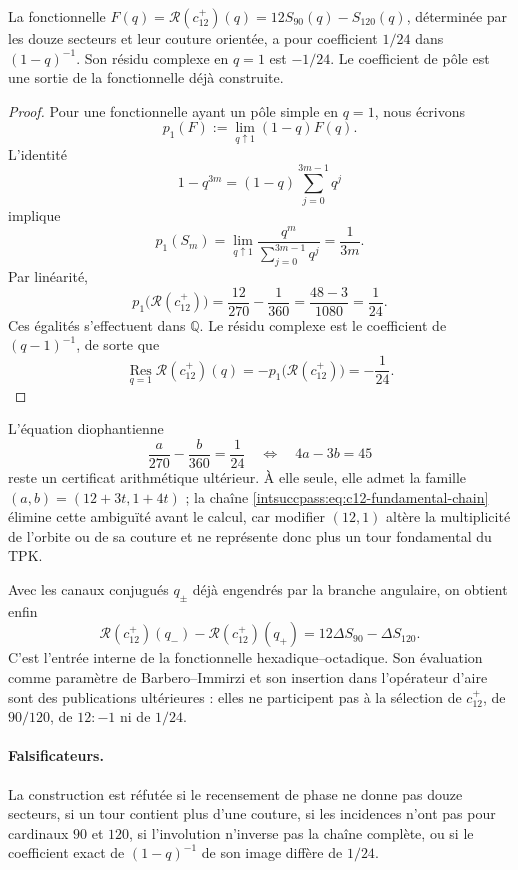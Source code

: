 \begin{theorem}
La fonctionnelle \(F(q)=\mathscr R(c_{12}^{+})(q)
=12S_{90}(q)-S_{120}(q)\), déterminée par les douze secteurs
et leur couture orientée, a pour coefficient \(1/24\) dans
\((1-q)^{-1}\). Son résidu complexe en \(q=1\) est \(-1/24\).
Le coefficient de pôle est une sortie de la fonctionnelle déjà construite.
\end{theorem}

\begin{proof}
Pour une fonctionnelle ayant un pôle simple en \(q=1\), nous écrivons
\[
 p_1(F):=\lim_{q\uparrow1}(1-q)F(q).
\]
L’identité
\[
 1-q^{3m}=(1-q)\sum_{j=0}^{3m-1}q^j
\]
implique
\[
 p_1(S_m)
 =\lim_{q\uparrow1}\frac{q^m}{\sum_{j=0}^{3m-1}q^j}
 =\frac1{3m}.
\]
Par linéarité,
\[
 p_1\bigl(\mathscr R(c_{12}^{+})\bigr)
 =\frac{12}{270}-\frac1{360}
 =\frac{48-3}{1080}=\frac1{24}.
\]
Ces égalités s’effectuent dans \(\mathbb Q\). Le résidu complexe
est le coefficient de \((q-1)^{-1}\), de sorte que
\[
 \operatorname*{Res}_{q=1}\mathscr R(c_{12}^{+})(q)
 =-p_1\bigl(\mathscr R(c_{12}^{+})\bigr)=-\frac1{24}.
\]
\end{proof}

L’équation diophantienne
\[
 \frac a{270}-\frac b{360}=\frac1{24}
 \quad\Longleftrightarrow\quad
 4a-3b=45
\]
reste un certificat arithmétique ultérieur. À elle seule, elle admet la
famille \((a,b)=(12+3t,1+4t)\) ; la chaîne
\eqref{intsuccpass:eq:c12-fundamental-chain} élimine cette ambiguïté avant le calcul,
car modifier \((12,1)\) altère la multiplicité de l’orbite ou de sa couture
et ne représente donc plus un tour fondamental du TPK.

Avec les canaux conjugués \(q_\pm\) déjà engendrés par la branche angulaire, on
obtient enfin
\[
 \mathscr R(c_{12}^{+})(q_-)-
 \mathscr R(c_{12}^{+})(q_+)
 =12\Delta S_{90}-\Delta S_{120}.
\]
C’est l’entrée interne de la fonctionnelle hexadique--octadique. Son évaluation
comme paramètre de Barbero--Immirzi et son insertion dans l’opérateur d’aire sont
des publications ultérieures : elles ne participent pas à la sélection de
\(c_{12}^{+}\), de \(90/120\), de \(12:-1\) ni de \(1/24\).

\paragraph{Falsificateurs.}
La construction est réfutée si le recensement de phase ne donne pas douze secteurs, si
un tour contient plus d’une couture, si les incidences n’ont pas pour
cardinaux \(90\) et \(120\), si l’involution n’inverse pas la chaîne complète,
ou si le coefficient exact de \((1-q)^{-1}\) de son image diffère de \(1/24\).
